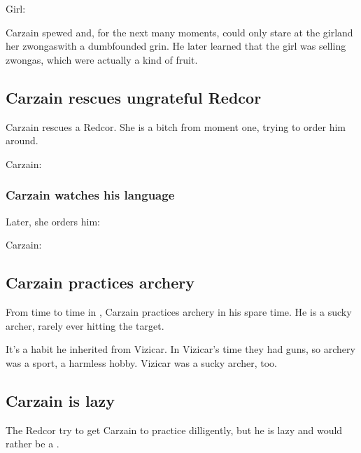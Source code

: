 Girl: 

Carzain spewed and, for the next many moments, could only stare at the girl\dash and her zwongas\dash with a dumbfounded grin. 
He later learned that the girl was selling zwongas, which were actually a kind of fruit. 









\subsection{Carzain rescues ungrateful Redcor}
Carzain rescues a Redcor. 
She is a bitch from moment one, trying to order him around. 

Carzain: 








\subsubsection{Carzain watches his language}
Later, she orders him: 

Carzain: 







\subsection{Carzain practices archery}
From time to time in \Redce, Carzain practices archery in his spare time. 
He is a sucky archer, rarely ever hitting the target. 

It's a habit he inherited from Vizicar. 
In Vizicar's time they had guns, so archery was a sport, a harmless hobby. 
Vizicar was a sucky archer, too. 







\subsection{Carzain is lazy}
The Redcor try to get Carzain to practice dilligently, but he is lazy and would rather be a \boheme. 

